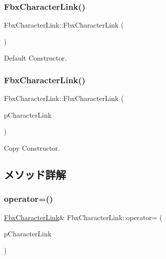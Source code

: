 \subsubsection{\texorpdfstring{Fbx\+Character\+Link()}{FbxCharacterLink()}\hspace{0.1cm}{\footnotesize\ttfamily [1/2]}}
{\footnotesize\ttfamily Fbx\+Character\+Link\+::\+Fbx\+Character\+Link (\begin{DoxyParamCaption}{ }\end{DoxyParamCaption})}

Default Constructor. \mbox{\label{class_fbx_character_link_a8f9d5ca289fe6fc60e6d3648112f8dcc}} 
\subsubsection{\texorpdfstring{Fbx\+Character\+Link()}{FbxCharacterLink()}\hspace{0.1cm}{\footnotesize\ttfamily [2/2]}}
{\footnotesize\ttfamily Fbx\+Character\+Link\+::\+Fbx\+Character\+Link (\begin{DoxyParamCaption}\item[{const \hyperlink{class_fbx_character_link}{Fbx\+Character\+Link} \&}]{p\+Character\+Link }\end{DoxyParamCaption})}

Copy Constructor. 

\subsection{メソッド詳解}
\mbox{\label{class_fbx_character_link_ace29a4d8c4a64bd6325513e6348c2504}} 
\subsubsection{\texorpdfstring{operator=()}{operator=()}}
{\footnotesize\ttfamily \hyperlink{class_fbx_character_link}{Fbx\+Character\+Link}\& Fbx\+Character\+Link\+::operator= (\begin{DoxyParamCaption}\item[{const \hyperlink{class_fbx_character_link}{Fbx\+Character\+Link} \&}]{p\+Character\+Link }\end{DoxyParamCaption})}

